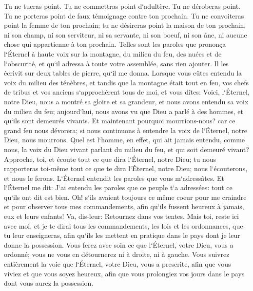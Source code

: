 \verse Tu ne tueras point. 
\verse Tu ne commettras point d`adultère. 
\verse Tu ne déroberas point. 
\verse Tu ne porteras point de faux témoignage contre ton prochain. 
\verse Tu ne convoiteras point la femme de ton prochain; tu ne désireras point la maison de ton prochain, ni son champ, ni son serviteur, ni sa servante, ni son boeuf, ni son âne, ni aucune chose qui appartienne à ton prochain. 
\verse Telles sont les paroles que prononça l`Éternel à haute voix sur la montagne, du milieu du feu, des nuées et de l`obscurité, et qu`il adressa à toute votre assemblée, sans rien ajouter. Il les écrivit sur deux tables de pierre, qu`il me donna. 
\verse Lorsque vous eûtes entendu la voix du milieu des ténèbres, et tandis que la montagne était tout en feu, vos chefs de tribus et vos anciens s`approchèrent tous de moi, 
\verse et vous dîtes: Voici, l`Éternel, notre Dieu, nous a montré sa gloire et sa grandeur, et nous avons entendu sa voix du milieu du feu; aujourd`hui, nous avons vu que Dieu a parlé à des hommes, et qu`ils sont demeurés vivants. 
\verse Et maintenant pourquoi mourrions-nous? car ce grand feu nous dévorera; si nous continuons à entendre la voix de l`Éternel, notre Dieu, nous mourrons. 
\verse Quel est l`homme, en effet, qui ait jamais entendu, comme nous, la voix du Dieu vivant parlant du milieu du feu, et qui soit demeuré vivant? 
\verse Approche, toi, et écoute tout ce que dira l`Éternel, notre Dieu; tu nous rapporteras toi-même tout ce que te dira l`Éternel, notre Dieu; nous l`écouterons, et nous le ferons. 
\verse L`Éternel entendit les paroles que vous m`adressâtes. Et l`Éternel me dit: J`ai entendu les paroles que ce peuple t`a adressées: tout ce qu`ils ont dit est bien. 
\verse Oh! s`ils avaient toujours ce même coeur pour me craindre et pour observer tous mes commandements, afin qu`ils fussent heureux à jamais, eux et leurs enfants! 
\verse Va, dis-leur: Retournez dans vos tentes. 
\verse Mais toi, reste ici avec moi, et je te dirai tous les commandements, les lois et les ordonnances, que tu leur enseigneras, afin qu`ils les mettent en pratique dans le pays dont je leur donne la possession. 
\verse Vous ferez avec soin ce que l`Éternel, votre Dieu, vous a ordonné; vous ne vous en détournerez ni à droite, ni à gauche. 
\verse Vous suivrez entièrement la voie que l`Éternel, votre Dieu, vous a prescrite, afin que vous viviez et que vous soyez heureux, afin que vous prolongiez vos jours dans le pays dont vous aurez la possession. 

\chapter{}

